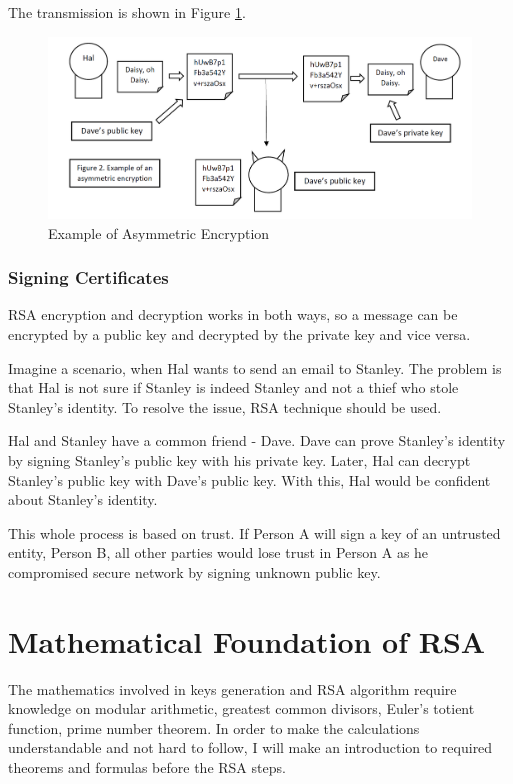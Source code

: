 \documentclass[a4paper, 12pt]{article}
\begin{document}
The transmission is shown in Figure \ref{fig:asymmetric}.

\begin{figure}[h!]
  \begin{center}
    \includegraphics[width=\textwidth]{asymmetric.png}
    \caption{Example of Asymmetric Encryption}
    \label{fig:asymmetric}
    \end{center}
  \end{figure}

\subsubsection{Signing Certificates}
\label{bbsec:signing}

RSA encryption and decryption works in both ways, so a
message can be encrypted by a public key and decrypted by the private key and vice versa.

Imagine a scenario, when Hal wants to send an email to Stanley. The problem is that Hal is not sure
if Stanley is indeed Stanley and not a thief who stole Stanley's identity. To resolve the issue, RSA
technique should be used. 

Hal and Stanley have a common friend - Dave. Dave can prove Stanley's identity by signing Stanley's
public key with his private key. Later, Hal can decrypt Stanley's public key with Dave's public key.
With this, Hal would be confident about Stanley's identity.

This whole process is based on trust. If Person A will sign a key of an untrusted entity, Person B, all other parties
would lose trust in Person A as he compromised secure network by signing unknown public key.

\section{Mathematical Foundation of RSA}
\label{sec:math}

The mathematics involved in keys generation and RSA algorithm require knowledge on modular
arithmetic, greatest common divisors, Euler's totient function, prime number theorem. In order to
make the calculations understandable and not hard to follow, I will make an introduction to
required theorems and formulas before the RSA steps.
\end{document}
